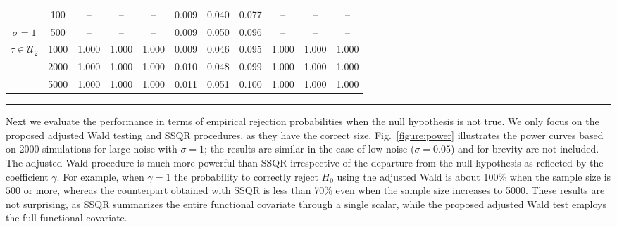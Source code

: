\documentclass[times,sort&compress,3p]{elsarticle}
\theoremstyle{plain}%
\theoremstyle{definition}
\begin{document}
\begin{table}
\begin{tabular}{ccccccccccc}
&  100 &     -- & -- & -- & 0.009 & 0.040 & 0.077 & -- & -- & -- \\ 
$\sigma = 1$ &  500 &     -- & -- & -- & 0.009 & 0.050 & 0.096 & -- & -- & -- \\ 
$ \tau \in \mathcal{U}_2$ &  1000 &     1.000 & 1.000 & 1.000 & 0.009 & 0.046 & 0.095 & 1.000 & 1.000 & 1.000 \\ 
&  2000 &     1.000 & 1.000 & 1.000 & 0.010 & 0.048 & 0.099 & 1.000 & 1.000 & 1.000 \\ 
&  5000 &     1.000 & 1.000 & 1.000 & 0.011 & 0.051 & 0.100 & 1.000 & 1.000 & 1.000 \\ 
\end{tabular}
\hrule
\end{table}

Next we evaluate the performance in terms of empirical rejection probabilities when the null hypothesis is not true. We only focus on the proposed adjusted Wald testing and SSQR procedures, as they have the correct size. Fig.~\ref{figure:power} illustrates the power curves based on 2000 simulations for large noise with $\sigma=1$; the results are similar in the case of low noise ($\sigma=0.05$) and for brevity are not included. The adjusted Wald procedure is much more powerful than SSQR irrespective of the departure from the null hypothesis as reflected by the coefficient $\gamma$. For example, when $\gamma=1$ the probability to correctly reject $H_0$ using the adjusted Wald is about 100\% when the sample size is $500$ or more, whereas the counterpart obtained with SSQR is less than 70\% even when the sample size increases to 5000. These results are not surprising, as SSQR summarizes the entire functional covariate through a single scalar, while the proposed adjusted Wald test employs the full functional covariate. 

\end{document}
